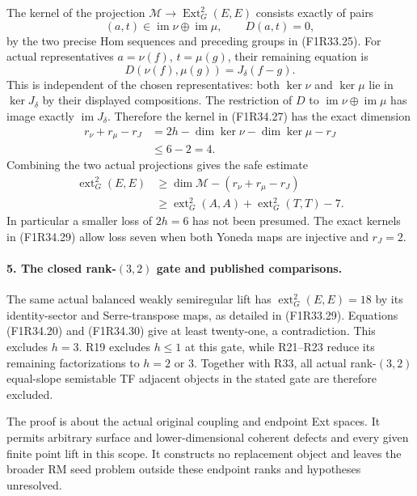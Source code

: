 The kernel of the projection
$\mathcal M\to\operatorname{Ext}^2_G(E,E)$
consists exactly of pairs
\[
           (a,t)\in\operatorname{im}\nu\oplus\operatorname{im}\mu,
                                  \qquad D(a,t)=0,
 \tag{F1R34.27}
\]
by the two precise Hom sequences
and preceding groups in
(F1R33.25). For actual representatives
$a=\nu(f)$, $t=\mu(g)$, their
remaining equation is
\[
                            D(\nu(f),\mu(g))=J_\delta(f-g).
 \tag{F1R34.28}
\]
This is independent of the chosen
representatives: both $\ker\nu$
and $\ker\mu$ lie in $\ker J_\delta$
by their displayed compositions.
The restriction of $D$ to
$\operatorname{im}\nu\oplus\operatorname{im}\mu$
has image exactly $\operatorname{im}J_\delta$.
Therefore the kernel in
(F1R34.27) has the exact dimension
\[
 \begin{split}
 r_\nu+r_\mu-r_J
       &=2h-\dim\ker\nu-\dim\ker\mu-r_J\\
       &\le6-2=4.
 \end{split}
 \tag{F1R34.29}
\]
Combining the two actual projections
gives the safe estimate
\[
 \begin{split}
 \operatorname{ext}^2_G(E,E)
    &\ge \dim\mathcal M-(r_\nu+r_\mu-r_J)\\
    &\ge \operatorname{ext}^2_G(A,A)
                  +\operatorname{ext}^2_G(T,T)-7.
 \end{split}
 \tag{F1R34.30}
\]
In particular a smaller loss of
$2h=6$ has not been presumed.
The exact kernels in (F1R34.29)
allow loss seven when both Yoneda
maps are injective and $r_J=2$.

\paragraph{5. The closed rank-$(3,2)$ gate and published comparisons.}
The same actual balanced weakly
semiregular lift has
$\operatorname{ext}^2_G(E,E)=18$
by its identity-sector and
Serre-transpose maps, as detailed
in (F1R33.29). Equations
(F1R34.20) and (F1R34.30) give
at least twenty-one, a contradiction.
This excludes $h=3$. R19 excludes
$h\le1$ at this gate, while
R21--R23 reduce its remaining
factorizations to $h=2$ or $3$.
Together with R33, all actual
rank-$(3,2)$ equal-slope semistable
TF adjacent objects in the stated
gate are therefore excluded.

The proof is about the actual
original coupling and endpoint
Ext spaces. It permits arbitrary
surface and lower-dimensional
coherent defects and every given
finite point lift in this scope.
It constructs no replacement object
and leaves the broader RM seed
problem outside these endpoint
ranks and hypotheses unresolved.

